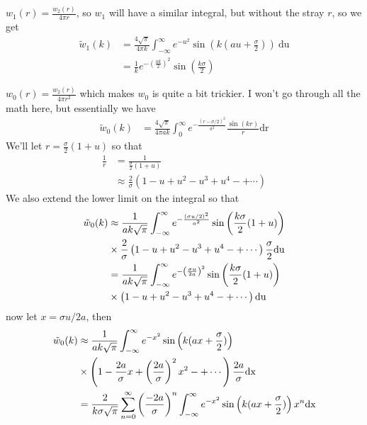 \documentclass[letterpaper,twocolumn,amsmath,amssymb,prb]{revtex4-1}
\begin{document}
$w_1(r) = \frac{w_2(r)}{4\pi r}$, so $w_1$ will have a similar
integral, but without the stray $r$, so we get
\begin{align}
  \tilde{w}_1(k)&= \frac{4\sqrt{\pi}}{4\pi k} \int_{-\infty}^\infty e^{-u^2} \sin\left(k\left(au +
  \frac{\sigma}{2}\right)\right) ~\textrm{du} \\
  &= \frac{1}{k}e^{-\left(\frac{ak}{2} \right)^2} \sin\left(\frac{k\sigma}{2}\right)
\end{align}

$w_0(r) = \frac{w_2(r)}{4\pi r^2}$ which makes $w_0$ is quite a bit
trickier.  I won't go through all the math here, but essentially we
have
\begin{align}
  \tilde{w}_0(k) &= \frac{4\sqrt{\pi}}{4\pi ak}\int_0^\infty
  e^{-\frac{(r-\sigma/2)^2}{a^2}} \frac{\sin(kr)}{r}\textrm{dr}
\end{align}
We'll let $r = \frac{\sigma}{2}(1 + u) $ so that
\begin{align}
  \frac{1}{r} &= \frac{1}{\frac{\sigma}{2}(1 + u)} \\
  &\approx \frac{2}{\sigma}\left(1 - u + u^2 - u^3 + u^4 -+\cdots \right)
\end{align}
We also extend the lower limit on the integral so that
\begin{align}
  \tilde{w}_0(k) &\approx \frac{1}{ak\sqrt{\pi}}\int_{-\infty}^\infty
  e^{-\frac{(\sigma u/2)^2}{a^2}} \sin{\left( \frac{k\sigma}{2}(1+u)
    \right)} \notag \\
  &\times \frac{2}{\sigma} \left(1 - u + u^2 - u^3 + u^4 -+\cdots
  \right) \frac{\sigma}{2}\textrm{du} \\
  &= \frac{1}{ak\sqrt{\pi}}\int_{-\infty}^\infty
  e^{-\left(\frac{\sigma u}{2a} \right)^2} \sin{\left( \frac{k\sigma}{2}(1+u)
    \right)} \notag \\
  &\times \left(1 - u + u^2 - u^3 + u^4 -+\cdots \right) \textrm{du}
\end{align}
now let $x = \sigma u /2a$, then
\begin{align}
  \tilde{w}_0(k) &\approx \frac{1}{ak\sqrt{\pi}}\int_{-\infty}^\infty
  e^{-x^2} \sin\left(k(ax+\frac{\sigma}{2})\right) \notag\\
  &\times \left(1 - \frac{2a}{\sigma}x +
  \left(\frac{2a}{\sigma}\right)^2 x^2 -+\cdots \right) \frac{2a}{\sigma}\textrm{dx} \\
  &= \frac{2}{k\sigma \sqrt{\pi}}\sum_{n=0}^{\infty}
  \left(\frac{-2a}{\sigma}\right)^n \int_{-\infty}^\infty e^{-x^2}
  \sin\left(k(ax+\frac{\sigma}{2})\right) x^n \textrm{dx}
\end{align}
\end{document}

